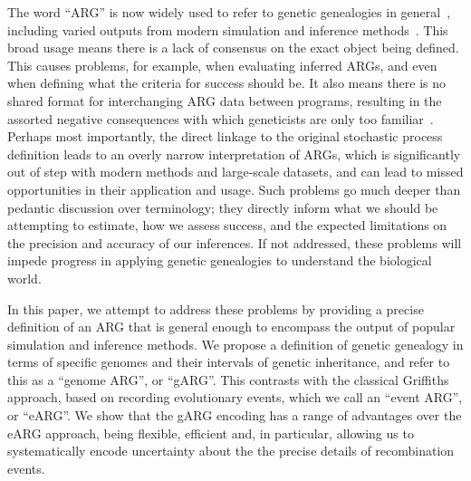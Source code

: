 \documentclass{article}
\newcommand{\tsinfer}[0]{\texttt{tsinfer}}
\begin{document}
The word ``ARG'' is now widely used to refer to genetic genealogies in
general~\citep[e.g.][]{mathieson2020ancestry,hejase2020summary,
schaefer2021ancestral,harris2023using,zhang2023biobank}, including
varied outputs from modern simulation and
inference methods~\citep{rasmussen2014genome, palamara2016argon, haller2018tree,
kelleher2019inferring, speidel2019method, baumdicker2021efficient, zhang2023biobank}.
This broad usage means there is a lack of consensus on the
exact object being defined. This causes problems, for example,
when evaluating inferred ARGs, and even when defining
what the criteria for success should be.
It also means there is no shared format for interchanging ARG data between
programs, resulting in the assorted negative consequences with which
geneticists are only too familiar~\citep{excoffier2006computer,gower2022demes}.
Perhaps most importantly, the direct linkage to
the original stochastic process definition leads to an
overly narrow interpretation of ARGs, which is significantly
out of step with modern methods and large-scale datasets, and
can lead to missed opportunities in their application and usage.
Such problems go much deeper than pedantic discussion over terminology;
they directly inform what we should be attempting to estimate, how we
assess success, and the expected limitations on the precision
and accuracy of our inferences.
If not addressed, these problems will
impede progress in applying genetic genealogies to understand the biological world.


In this paper, we attempt to address these problems by
providing a precise definition of an ARG that is general enough to encompass
the output of popular simulation and inference methods.
We propose a definition of genetic genealogy in terms of specific genomes
and their intervals of genetic inheritance, and refer to this as
a ``genome ARG'', or ``gARG''.
This contrasts with the classical Griffiths approach,
based on recording evolutionary events, which we call
an ``event ARG'', or ``eARG''.
We show that the gARG encoding has a range of advantages over the
eARG approach, being flexible, efficient and, in particular,
allowing us to systematically encode uncertainty about the
the precise details of recombination events.
\end{document}
